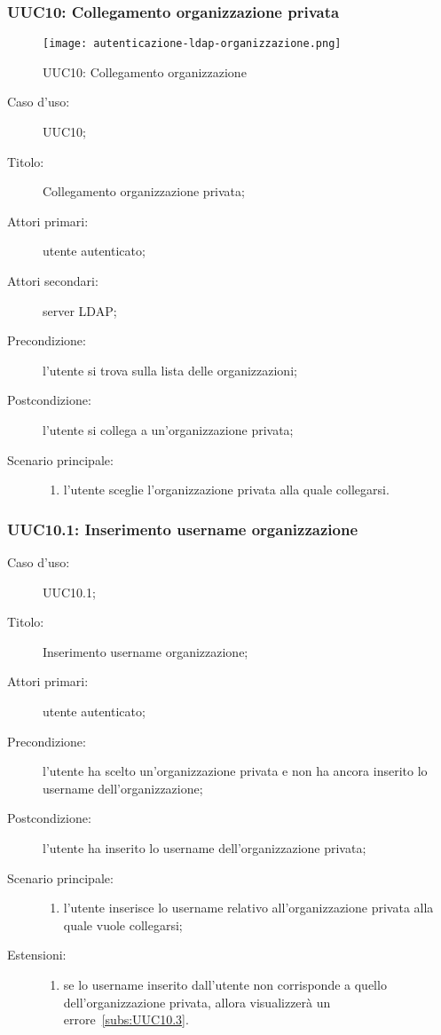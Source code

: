 \documentclass[../../../analisi-dei-requisiti.tex]{subfiles}
\begin{document}
\subsubsection{UUC10: Collegamento organizzazione privata}%
\label{subs:UUC10}

\begin{figure}[H]
  \centering
  \texttt{[image: autenticazione-ldap-organizzazione.png]}
  \caption{UUC10: Collegamento organizzazione }%
  \label{fig:UUC10}
\end{figure}

\begin{description}
  \item[Caso d’uso:] UUC10;
  \item[Titolo:] Collegamento organizzazione privata;
  \item[Attori primari:] utente autenticato;
  \item[Attori secondari:] server LDAP\@;
  \item[Precondizione:] l'utente si trova sulla lista delle organizzazioni;
  \item[Postcondizione:] l'utente si collega a un'organizzazione privata;
  \item[Scenario principale:]
        \begin{enumerate}
          \item l'utente sceglie l'organizzazione privata alla quale collegarsi.
        \end{enumerate}
\end{description}

\subsubsection{UUC10.1: Inserimento username organizzazione}%
\label{subs:UUC10.1}
\begin{description}
  \item[Caso d’uso:] UUC10.1;
  \item[Titolo:] Inserimento username organizzazione;
  \item[Attori primari:] utente autenticato;
  \item[Precondizione:] l'utente ha scelto un'organizzazione privata e non ha ancora inserito lo username dell'organizzazione;
  \item[Postcondizione:] l'utente ha inserito lo username dell'organizzazione privata;
  \item[Scenario principale:]
        \begin{enumerate}
          \item l'utente inserisce lo username relativo all'organizzazione privata alla quale vuole collegarsi;
        \end{enumerate}
  \item[Estensioni:]
        \begin{enumerate}
          \item se lo username inserito dall'utente non corrisponde a quello dell'organizzazione privata, allora visualizzerà un errore~\ref{subs:UUC10.3}.
        \end{enumerate}
\end{description}
\end{document}
